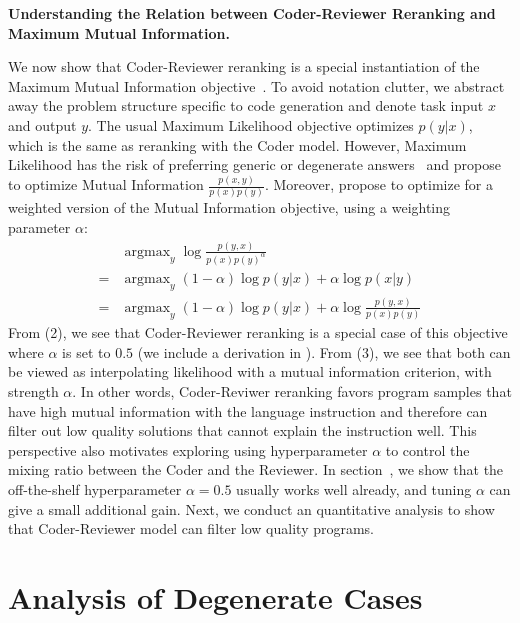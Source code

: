 \documentclass[nohyperref]{article}
\theoremstyle{plain}
\theoremstyle{definition}
\theoremstyle{remark}
\renewcommand{\paragraph}[1]{
     \textbf{#1} 
 }
\begin{document}
\paragraph{Understanding the Relation between Coder-Reviewer Reranking and Maximum Mutual Information.}
We now show that Coder-Reviewer reranking is a special instantiation of the Maximum Mutual Information objective~\citep{mmi-diversity}. 
To avoid notation clutter, we abstract away the problem structure specific to code generation and denote task input $x$ and output $y$.
The usual Maximum Likelihood objective optimizes $p(y|x)$, which is the same as reranking with the Coder model.
However, Maximum Likelihood has the risk of preferring generic or degenerate answers~\citep{curious-case} and \citet{mmi-diversity} propose to optimize Mutual Information $\frac{p(x, y)}{p(x)p(y)}$.
Moreover, \citet{mmi-diversity} propose to optimize for a weighted version of the Mutual Information objective, using a weighting parameter $\alpha$:
\begin{align}
    & \text{argmax}_{y}\; \log \frac{p(y, x)}{p(x)p(y)^{\alpha}}\\
    =\; &\text{argmax}_{y}\;(1-\alpha)\log p(y|x) + \alpha \log p(x|y) \\
    =\; &\text{argmax}_{y}\; (1-\alpha)\log p(y|x) + \alpha \log \frac{p(y, x)}{p(x)p(y)}
\end{align}
From (2), we 
see that Coder-Reviewer reranking is a special case of this objective where $\alpha$ is set to $0.5$ (we include a derivation in ).
From (3), we see that both can be viewed as interpolating likelihood with a mutual information criterion, with strength $\alpha$.
In other words, Coder-Reviwer reranking favors program samples that have high mutual information with the language instruction and therefore can filter out low quality solutions that cannot explain the instruction well.
This perspective also motivates exploring using hyperparameter $\alpha$ to control the mixing ratio between the Coder and the Reviewer.
In section~, we show that the off-the-shelf hyperparameter $\alpha=0.5$ usually works well already, and tuning $\alpha$ can give a small additional gain.
Next, we conduct an quantitative analysis to show that Coder-Reviewer model can filter low quality programs.
 \section{Analysis of Degenerate Cases}
\label{sec:analysis}
\end{document}
